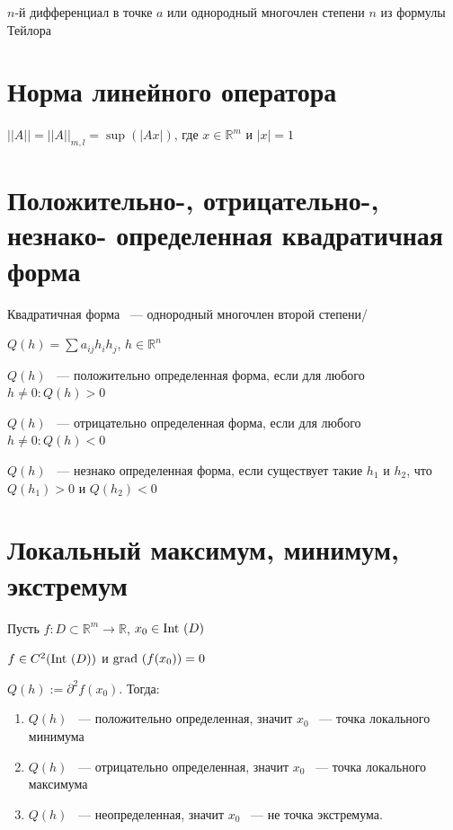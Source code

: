 \documentclass{article}
\begin{document}
        $n$-й дифференциал в точке $a$ или однородный многочлен степени $n$ из формулы Тейлора
        
    \newpage
    
    \section{Норма линейного оператора}
    
        $|| A || = || A ||_{m, l} = \sup \left( \left| A x \right| \right)$, где $x \in \mathbb{R}^m$ и $\left| x \right| = 1$
        
    \newpage
    
    \section{Положительно-, отрицательно-, незнако- определенная квадратичная форма}
        
        Квадратичная форма ~--- однородный многочлен второй степени/
        
        $Q(h) = \sum a_{ij} h_i h_j$, $h \in \mathbb{R}^n$

        $Q(h)$ ~--- положительно определенная форма, если для любого $h \neq 0 : Q(h) > 0$
        
        $Q(h)$ ~--- отрицательно определенная форма, если для любого $h \neq 0 : Q(h) < 0$
        
        $Q(h)$ ~--- незнако определенная форма, если существует такие $h_1$ и $h_2$, что $Q(h_1) > 0$ и $Q(h_2) < 0$
        
    \newpage
    
    \section{Локальный максимум, минимум, экстремум}
    
        Пусть $f : D \subset \mathbb{R}^m \rightarrow \mathbb{R}$, $x_0 \in \Int (D)$
        
        $f \in C^2(\Int (D))$ и $\grad(f(x_0)) = 0$
        
        $Q(h) := \partial^2 f(x_0)$. Тогда:
        
        \begin{enumerate}
        
            \item $Q(h)$ ~--- положительно определенная, значит $x_0$ ~--- точка локального минимума
            
            \item $Q(h)$ ~--- отрицательно определенная, значит $x_0$ ~--- точка локального максимума
            
            \item $Q(h)$ ~--- неопределенная, значит $x_0$ ~--- не точка экстремума.
            
        \end{enumerate}
        
\end{document}
